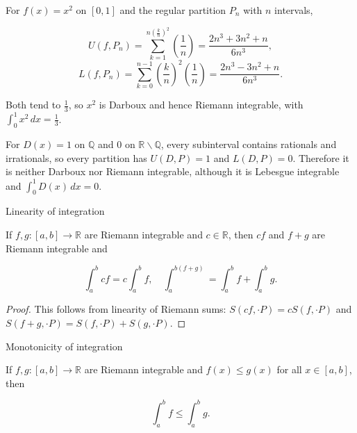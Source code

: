 \begin{example}

For \(f(x) = x^{2}\) on \(\left\lbrack {0,1} \right\rbrack\) and the regular partition \(P_{n}\) with \(n\) intervals,

\[U\left( {f,P_{n}} \right) = \sum\limits_{k = 1}^{{n{(\frac{k}{n})}}^{2}}\left( \frac{1}{n} \right) = \frac{2n^{3} + 3n^{2} + n}{6n^{3}},\]\[L\left( {f,P_{n}} \right) = \sum\limits_{k = 0}^{n - 1}\left( \frac{k}{n} \right)^{2}\left( \frac{1}{n} \right) = \frac{2n^{3} - 3n^{2} + n}{6n^{3}}.\]

Both tend to \(\frac{1}{3}\), so \(x^{2}\) is Darboux and hence Riemann integrable, with \(\int_{0}^{1}x^{2}\, dx = \frac{1}{3}\).

For \(D(x) = 1\) on \(\mathbb{Q}\) and \(0\) on \(\mathbb{R} \smallsetminus \mathbb{Q}\), every subinterval contains rationals and irrationals, so every partition has \(U\left( {D,P} \right) = 1\) and \(L\left( {D,P} \right) = 0\). Therefore it is neither Darboux nor Riemann integrable, although it is Lebesgue integrable and \(\int_{0}^{1}D(x)\, dx = 0\).

\end{example}

\begin{theorem}{Linearity of integration}

If \(f,g:\left\lbrack {a,b} \right\rbrack\rightarrow\mathbb{R}\) are Riemann integrable and \(c \in \mathbb{R}\), then \(cf\) and \(f + g\) are Riemann integrable and

\[\int_{a}^{b}cf = c\int_{a}^{b}f,\quad\int_{a}^{b{({f + g})}} = \int_{a}^{b}f + \int_{a}^{b}g.\]

\end{theorem}

\begin{proof}

This follows from linearity of Riemann sums: \(S\left( {cf, \cdot P} \right) = cS\left( {f, \cdot P} \right)\) and \(S\left( {f + g, \cdot P} \right) = S\left( {f, \cdot P} \right) + S\left( {g, \cdot P} \right)\).

\end{proof}

\begin{theorem}{Monotonicity of integration}

If \(f,g:\left\lbrack {a,b} \right\rbrack\rightarrow\mathbb{R}\) are Riemann integrable and \(f(x) \leq g(x)\) for all \(x \in \left\lbrack {a,b} \right\rbrack\), then

\[\int_{a}^{b}f \leq \int_{a}^{b}g.\]

\end{theorem}

